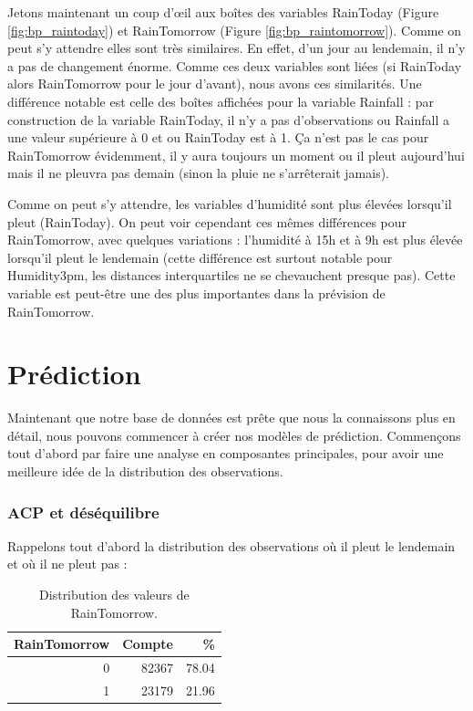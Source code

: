 \documentclass{article}
\begin{document}
Jetons maintenant un coup d'œil aux boîtes des variables RainToday (Figure \ref{fig:bp_raintoday}) et RainTomorrow (Figure \ref{fig:bp_raintomorrow}). Comme on peut s'y attendre elles sont très similaires. En effet, d'un jour au lendemain, il n'y a pas de changement énorme. Comme ces deux variables sont liées (si RainToday alors RainTomorrow pour le jour d'avant), nous avons ces similarités. Une différence notable est celle des boîtes affichées pour la variable Rainfall : par construction de la variable RainToday, il n'y a pas d'observations ou Rainfall a une valeur supérieure à 0 et ou RainToday est à 1. Ça n'est pas le cas pour RainTomorrow évidemment, il y aura toujours un moment ou il pleut aujourd'hui mais il ne pleuvra pas demain (sinon la pluie ne s'arrêterait jamais).

Comme on peut s'y attendre, les variables d'humidité sont plus élevées lorsqu'il pleut (RainToday). On peut voir cependant ces mêmes différences pour RainTomorrow, avec quelques variations : l'humidité à 15h et à 9h est plus élevée lorsqu'il pleut le lendemain (cette différence est surtout notable pour Humidity3pm, les distances interquartiles ne se chevauchent presque pas). Cette variable est peut-être une des plus importantes dans la prévision de RainTomorrow.

\newpage
\part{Prédiction}

Maintenant que notre base de données est prête que nous la connaissons plus en détail, nous pouvons commencer à créer nos modèles de prédiction. Commençons tout d'abord par faire une analyse en composantes principales, pour avoir une meilleure idée de la distribution des observations.

\section{ACP et déséquilibre}

Rappelons tout d'abord la distribution des observations où il pleut le lendemain et où il ne pleut pas : 

\begin{table}[H]
    \centering
        \begin{tabular}{|rrr|}
            \hline
            RainTomorrow & Compte & \% \\ 
            \hline
            \hline
            0 & 82367 & 78.04 \\
            1 & 23179 & 21.96 \\
            \hline
        \end{tabular}
    \caption{Distribution des valeurs de RainTomorrow.}
\end{table}
\end{document}
